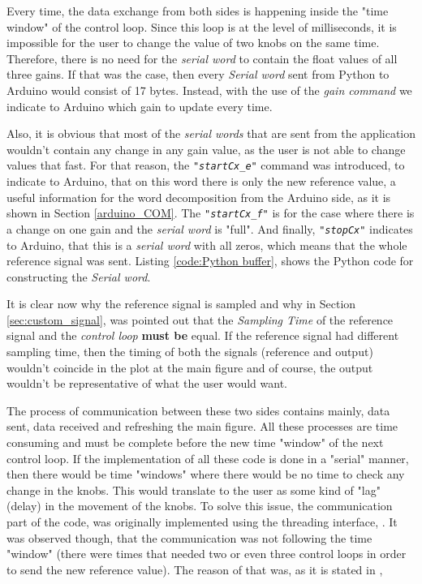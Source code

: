 Every time, the data exchange from both sides is happening inside the "time window" of the control loop. Since this loop is at the level of milliseconds, it is impossible for the user to change the value of two knobs on the same time. Therefore, there is no need for the \textit{serial word} to contain the float values of all three gains. If that was the case, then every \textit{Serial word} sent from Python to Arduino would consist of 17 bytes. Instead, with the use of the \textit{gain command} we indicate to Arduino which gain to update every time.

Also, it is obvious that most of the \textit{serial words} that are sent from the application wouldn't contain any change in any gain value, as the user is not able to change values that fast. For that reason, the \textit{\texttt{"startCx\_e"}} command was introduced, to indicate to Arduino, that on this word there is only the new reference value, a useful information for the word decomposition from the Arduino side, as it is shown in Section \ref{arduino_COM}. The \textit{\texttt{"startCx\_f"}} is for the case where there is a change on one gain and the \textit{serial word} is "full". And finally, \textit{\texttt{"stopCx"}} indicates to Arduino, that this is a \textit{serial word} with all zeros, which means that the whole reference signal was sent. Listing \ref{code:Python buffer}, shows the Python code for constructing the \textit{Serial word}.

It is clear now why the reference signal is sampled and why in Section \ref{sec:custom_signal}, was pointed out that the \textit{Sampling Time} of the reference signal and the \textit{control loop} \textbf{must be} equal. If the reference signal had different sampling time, then the timing of both the signals (reference and output) wouldn't coincide in the plot at the main figure and of course, the output wouldn't be representative of what the user would want.

The process of communication between these two sides contains mainly, data sent, data received and refreshing the main figure. All these processes are time consuming and must be complete before the new time "window" of the next control loop. If the implementation of all these code is done in a "serial" manner, then there would be time "windows" where there would be no time to check any change in the knobs. This would translate to the user as some kind of "lag" (delay) in the movement of the knobs. To solve this issue, the communication part of the code, was originally implemented using the threading interface, \cite{NoThreading}. It was observed though, that the communication was not following the time "window" (there were times that needed two or even three control loops in order to send the new reference value). The reason of that was, as it is stated in \cite{NoThreading},

